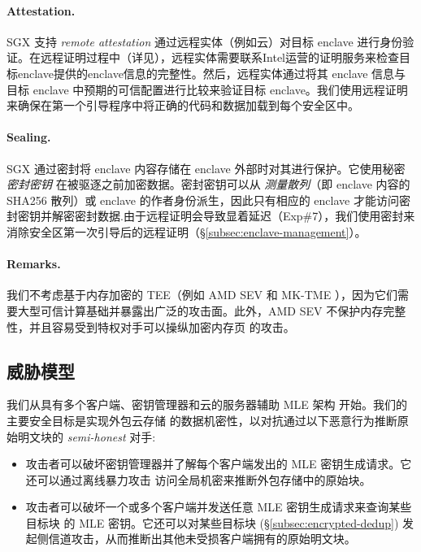 \paragraph{Attestation.} SGX 支持 \textit{ remote attestation} 通过远程实体（例如云）对目标 enclave 进行身份验证。在远程证明过程中（详见\cite{sgx}），远程实体需要联系Intel运营的证明服务来检查目标enclave提供的enclave信息的完整性。然后，远程实体通过将其 enclave 信息与目标 enclave 中预期的可信配置进行比较来验证目标 enclave。我们使用远程证明来确保在第一个引导程序中将正确的代码和数据加载到每个安全区中。

\paragraph{Sealing.} SGX 通过密封将 enclave 内容存储在 enclave 外部时对其进行保护。它使用秘密 \textit{ 密封密钥} 在被驱逐之前加密数据。密封密钥可以从 \textit{ 测量散列}（即 enclave 内容的 SHA256 散列）或 enclave 的作者身份派生，因此只有相应的 enclave 才能访问密封密钥并解密密封数据.由于远程证明会导致显着延迟（Exp\#7），我们使用密封来消除安全区第一次引导后的远程证明（\S\ref{subsec:enclave-management}）。

\paragraph{Remarks.} 我们不考虑基于内存加密的 TEE（例如 AMD SEV \cite{Amdsev} 和 MK-TME \cite{Mktem}），因为它们需要大型可信计算基础并暴露出广泛的攻击面\cite{mofrad18}。此外，AMD SEV \cite{Amdsev} 不保护内存完整性，并且容易受到特权对手可以操纵加密内存页 \cite{mofrad18} 的攻击。

\subsection{威胁模型}
\label{subsec:threat}

 我们从具有多个客户端、密钥管理器和云的服务器辅助 MLE 架构 \cite{bellare13b} 开始。我们的主要安全目标是实现外包云存储 \cite{bellare13b} 的数据机密性，以对抗通过以下恶意行为推断原始明文块的 \textit{ semi-honest} 对手:

\begin{itemize}[leftmargin=*]
\item 攻击者可以破坏密钥管理器并了解每个客户端发出的 MLE 密钥生成请求。它还可以通过离线暴力攻击 \cite{bellare13b} 访问全局机密来推断外包存储中的原始块。
    \item 攻击者可以破坏一个或多个客户端并发送任意 MLE 密钥生成请求来查询某些目标块 \cite{bellare13b} 的 MLE 密钥。它还可以对某些目标块 \cite{harnik10} (\S\ref{subsec:encrypted-dedup}) 发起侧信道攻击，从而推断出其他未受损客户端拥有的原始明文块。
\end{itemize}

